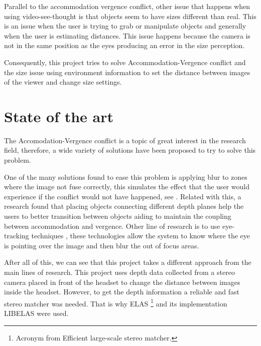 \documentclass[10pt,a4paper,twocolumn,twoside]{article}
\begin{document}
	Parallel to the accommodation vergence conflict, other issue that happens when using video-see-thought is that objects seem to have sizes different than real. This is an issue when the user is trying to grab or manipulate objects and generally when the user is estimating distances. This issue happens because the camera is not in the same position as the eyes producing an error in the size perception.
	
	Consequently, this project tries to solve Accommodation-Vergence conflict and the size issue using environment information to set the distance between images of the viewer and change size settings.
	
		
	\section{State of the art}
	The Accomodation-Vergence conflict is a topic of great interest in the research field, therefore, a wide variety of  solutions have been proposed to try to solve this problem. 
	
	One of the many solutions found to ease this problem is applying blur to zones where the image not fuse correctly, this simulates the effect that the user would experience if the conflict would not have happened, see \cite{neareyeblur}. Related with this, a research \cite{sceneComposition} found that placing objects connecting different depth planes help the users to better transition between objects aiding to maintain the coupling between accommodation and vergence. Other line of research is to use eye-tracking techniques \cite{eyeTracking}, these technologies allow the system to know where the eye is pointing over the image and then blur the out of focus areas. 
	
	After all of this, we can see that this project takes a different approach from the main lines of research.  This project uses depth data collected from a stereo camera placed in front of the headset to change the distance between images inside the headset. However, to get the depth information a reliable and fast stereo matcher was needed. That is why ELAS \footnote{Acronym from Efficient large-scale stereo matcher.}\cite{LIBELAS} and its implementation LIBELAS were used.
		
\end{document}
